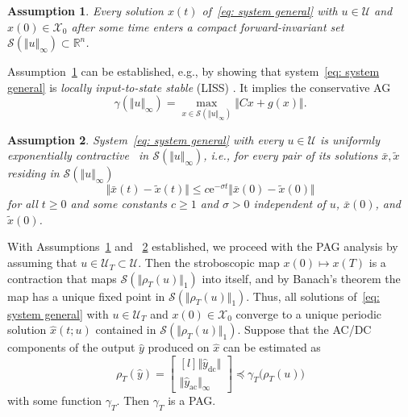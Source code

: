 \documentclass[letterpaper, 10 pt, conference]{ieeeconf}
\newcommand{\ac}{_\mathrm{ac}}
\newcommand{\dc}{_\mathrm{dc}}
\newcommand{\ee}{\mathrm{e}}
\newcommand{\pb}[1]{\big( #1 \big)}
\newcommand{\norm}[1]{\Vert #1 \Vert}
\newcommand{\bbR}{\mathbb{R}}
\newcommand{\calU}{\mathcal{U}}
\newcommand{\calX}{\mathcal{X}}
\newcommand{\calS}{\mathcal{S}}
\newtheorem{assumption}{Assumption}
\begin{document}
\begin{assumption}
    \label{as: LISS}
    Every solution $x(t)$ of~\eqref{eq: system general} with $u \in \calU$ and $x(0) \in \calX_0$ after some time enters a compact forward-invariant set $\calS(\norm{u}_\infty) \subset \bbR^n$.
\end{assumption}

Assumption~\ref{as: LISS} can be established, e.g., by showing that system~\eqref{eq: system general} is \emph{locally input-to-state stable} (LISS) \cite{sontagNewCharacterizationsInputtostate1996}. It implies the conservative AG
\begin{equation}
    \label{eq: scenario AG}
    \gamma(\norm{u}_\infty) = \max_{x \in \calS(\norm{u}_\infty)} \norm{Cx + g(x)}.
\end{equation}

\begin{assumption}
    \label{as: contraction}
    System~\eqref{eq: system general} with every $u \in \calU$ is \emph{uniformly exponentially contractive}~\cite{lohmillerContractionAnalysisNonlinear1998} in $\calS(\norm{u}_\infty)$, i.e., for every pair of its solutions $\bar x, \tilde x$ residing in $\calS(\norm{u}_\infty)$
    \begin{equation}
        \norm{\bar x(t) - \tilde x(t)} \leq c \ee^{-\sigma t} \norm{\bar x(0) - \tilde x(0)}
    \end{equation}
    for all $t \geq 0$ and some constants $c \geq 1$ and $\sigma > 0$ independent of $u$, $\bar x(0)$, and $\tilde x(0)$.
\end{assumption}

With Assumptions~\ref{as: LISS} and ~\ref{as: contraction} established, we proceed with the PAG analysis by assuming that $u \in \calU_T \subset \calU$. Then the stroboscopic map $x(0) \mapsto x(T)$ is a contraction that maps $\calS(\norm{\rho_T(u)}_1)$ into itself, and by Banach's theorem the map has a unique fixed point in $\calS(\norm{\rho_T(u)}_1)$. Thus, all solutions of~\eqref{eq: system general} with $u \in \calU_T$ and $x(0) \in \calX_0$ converge to a unique periodic solution $\hat x(t; u)$ contained in $\calS(\norm{\rho_T(u)}_1)$. Suppose that the AC/DC components of the output $\hat y$ produced on $\hat x$ can be estimated as
\begin{equation}
    \label{eq: y hat estimation scenario}
    \rho_T(\hat y) =
    \begin{bmatrix*}[l]
        \norm{\hat y\dc} \\
        \norm{\hat y\ac}_\infty
    \end{bmatrix*} \preceq \gamma_T\pb{\rho_T(u)}
\end{equation}
with some function $\gamma_T$. Then $\gamma_T$ is a PAG.
\end{document}
